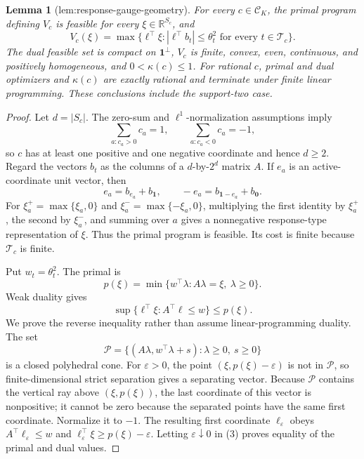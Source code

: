 \documentclass{article}
\newtheorem{lemma}{Lemma}
\begin{document}
\begin{lemma}[lem:response-gauge-geometry]\label{lem:response-gauge-geometry}
For every \(c\in\mathcal C_K\), the primal program defining \(V_c\) is feasible for every \(\xi\in\mathbb R^{S_c}\), and
\[
V_c(\xi)=\max\{\ell^\top\xi:|\ell^\top b_t|\le\theta_t^2\text{ for every }t\in\mathcal T_c\}.
\]
The dual feasible set is compact on \(\mathbf 1^\perp\), \(V_c\) is finite, convex, even, continuous, and positively homogeneous, and \(0<\kappa(c)\le1\). For rational \(c\), primal and dual optimizers and \(\kappa(c)\) are exactly rational and terminate under finite linear programming. These conclusions include the support-two case.
\end{lemma}
\begin{proof}
Let \(d=|S_c|\).  The zero-sum and \(\ell^1\)-normalization assumptions imply
\[
\sum_{a:c_a>0}c_a=1,
\qquad
\sum_{a:c_a<0}c_a=-1,
\tag{1}
\]
so \(c\) has at least one positive and one negative coordinate and hence \(d\ge2\).  Regard the vectors \(b_t\) as the columns of a \(d\)-by-\(2^d\) matrix \(A\).  If \(e_a\) is an active-coordinate unit vector, then
\[
e_a=b_{e_a}+b_{\mathbf 1},
\qquad
-e_a=b_{\mathbf 1-e_a}+b_{\mathbf 0}.
\tag{2}
\]
For \(\xi_a^+=\max\{\xi_a,0\}\) and \(\xi_a^-=\max\{-\xi_a,0\}\), multiplying the first identity by \(\xi_a^+\), the second by \(\xi_a^-\), and summing over \(a\) gives a nonnegative response-type representation of \(\xi\).  Thus the primal program is feasible.  Its cost is finite because \(\mathcal T_c\) is finite.

Put \(w_t=\theta_t^2\).  The primal is
\[
p(\xi)=\min\{w^\top\lambda:A\lambda=\xi,\ \lambda\ge0\}.
\]
Weak duality gives
\[
\sup\{\ell^\top\xi:A^\top\ell\le w\}\le p(\xi).
\tag{3}
\]
We prove the reverse inequality rather than assume linear-programming duality.  The set
\[
\mathcal P=\{(A\lambda,w^\top\lambda+s):\lambda\ge0,\ s\ge0\}
\]
is a closed polyhedral cone.  For \(\varepsilon>0\), the point \((\xi,p(\xi)-\varepsilon)\) is not in \(\mathcal P\), so finite-dimensional strict separation gives a separating vector.  Because \(\mathcal P\) contains the vertical ray above \((\xi,p(\xi))\), the last coordinate of this vector is nonpositive; it cannot be zero because the separated points have the same first coordinate.  Normalize it to \(-1\).  The resulting first coordinate \(\ell_\varepsilon\) obeys \(A^\top\ell_\varepsilon\le w\) and \(\ell_\varepsilon^\top\xi\ge p(\xi)-\varepsilon\).  Letting \(\varepsilon\downarrow0\) in (3) proves equality of the primal and dual values.


\end{proof}
\end{document}
